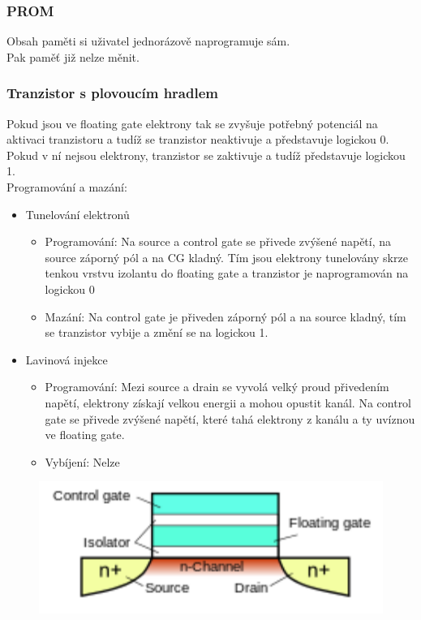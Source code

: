 \subsubsection*{PROM}
Obsah paměti si uživatel jednorázově naprogramuje sám. \\
Pak paměť již nelze měnit. \\

\subsubsection*{Tranzistor s plovoucím hradlem}
Pokud jsou ve floating gate elektrony tak se zvyšuje potřebný potenciál na aktivaci tranzistoru a tudíž se tranzistor neaktivuje a představuje logickou 0. \\
Pokud v ní nejsou elektrony, tranzistor se zaktivuje a tudíž představuje logickou 1. \\
Programování a mazání:
\begin{itemize}
    \item Tunelování elektronů
          \begin{itemize}
              \item Programování: Na source a control gate se přivede zvýšené napětí, na source záporný pól a na CG kladný. Tím jsou elektrony tunelovány skrze tenkou vrstvu izolantu do floating gate a tranzistor je naprogramován na logickou 0
              \item Mazání: Na control gate je přiveden záporný pól a na source kladný, tím se tranzistor vybije a změní se na logickou 1.
          \end{itemize}
    \item Lavinová injekce
          \begin{itemize}
              \item Programování: Mezi source a drain se vyvolá velký proud přivedením napětí, elektrony získají velkou energii a mohou opustit kanál. Na control gate se přivede zvýšené napětí, které tahá elektrony z kanálu a ty uvíznou ve floating gate.
              \item Vybíjení: Nelze
          \end{itemize}
\end{itemize}

\begin{figure}[h!]
    \centering
    \includegraphics[]{img/FGMOS.png}
\end{figure}
